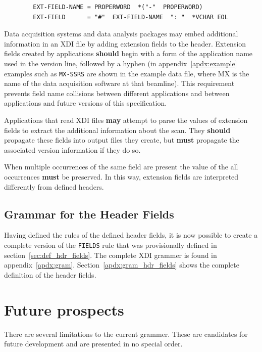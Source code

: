 \documentclass{article}
\newcommand{\xdi}{\textsf{XDI}}
\begin{document}
\begin{verbatim}
        EXT-FIELD-NAME = PROPERWORD  *("-"  PROPERWORD)
        EXT-FIELD      = "#"  EXT-FIELD-NAME  ": "  *VCHAR EOL
\end{verbatim}

Data acquisition systems and data analysis packages may embed
additional information in an {\xdi} file by adding extension fields to
the header.  Extension fields created by applications \textbf{should}
begin with a form of the application name used in the version line,
followed by a hyphen (in appendix~\ref{apdx:example} examples such as
\texttt{MX-SSRS} are shown in the example data file, where MX is the
name of the data acquisition software at that beamline).  This
requirement prevents field name collisions between different
applications and between applications and future versions of this
specification.

Applications that read {\xdi} files \textbf{may} attempt to parse the
values of extension fields to extract the additional information about
the scan.  They \textbf{should} propagate these fields into output
files they create, but \textbf{must} propagate the associated version
information if they do so.

When multiple occurrences of the same field are present the value of
the all occurrences \textbf{must} be preserved.  In this way,
extension fields are interpreted differently from defined headers.

\subsection{Grammar for the Header Fields}
\label{sec:ixsif_fields_grammar}

Having defined the rules of the defined header fields, it is now
possible to create a complete version of the \texttt{FIELDS} rule that
was provisionally defined in section~\ref{sec:def_hdr_fields}.  The
complete {\xdi} grammer is found in appendix~\ref{apdx:gram}.
Section~\ref{apdx:gram_hdr_fields} shows the complete definition of
the header fields.

\section{Future prospects}
\label{sec:future}

There are several limitations to the current grammer.  These are
candidates for future development and are presented in no special
order.
\end{document}
